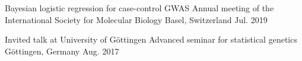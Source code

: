 


\begin{cventries}


\cventry
{Bayesian logistic regression for case-control GWAS} %
{Annual meeting of the International Society for Molecular Biology} %
{Basel, Switzerland} %
{Jul. 2019} %
{ %
}


\cventry
{Invited talk at University of G{\"o}ttingen} %
{Advanced seminar for statistical genetics} %
{G{\"o}ttingen, Germany} %
{Aug. 2017} %
{ %
}


\end{cventries}
